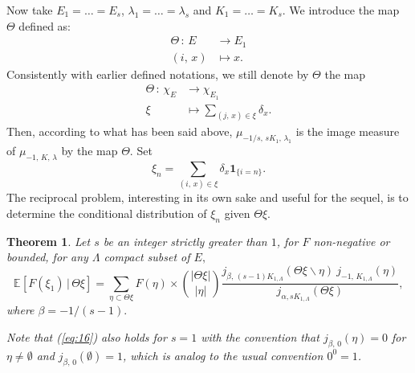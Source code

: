 \documentclass[11pt,a4paper]{amsart}
\newtheorem{Theorem}{Theorem}
\begin{document}
Now take $E_1=\ldots=E_s$, $\lambda_1=\ldots=\lambda_s$ and
$K_1=\ldots=K_s$. We introduce the map $\Theta$ defined as:
\begin{align*}
  \Theta \, :\, E&\longrightarrow E_1\\
  (i,\, x) & \longmapsto x.
\end{align*}
Consistently with earlier defined notations, we still denote by
$\Theta$ the map
\begin{align*}
  \Theta \, :\, \chi_E & \longrightarrow \chi_{E_1}\\
  \xi & \longmapsto \sum_{(j,\, x)\in \xi} \delta_{x}.
\end{align*}
Then, according to what has been said above, $\mu_{-1/s,\, sK_1,\,
  \lambda_1}$ is the image measure of $\mu_{-1, \, K,\, \lambda}$ by
the map $\Theta.$ Set
$$\xi_n=\sum_{(i,\, x)\in\xi} \delta_x{{\mathbf 1}}_{\{i=n\}}.$$ 
The reciprocal problem, interesting in its own sake and useful for the
sequel, is to determine the conditional distribution of $\xi_n$ given
$\Theta\xi.$
\begin{Theorem}
  \label{thm:conditional_distribution}
  Let $s$ be an integer strictly greater than $1$, for $F$
  non-negative or bounded, for any $\Lambda$ compact subset of $E,$
  \begin{equation}\label{eq:16}
    {{\mathbb E}_{{}}\left[{{F(\xi_1)\, |\, \Theta\xi}}\right]}=\sum_{\eta\subset \Theta\xi} F(\eta)\times 
    \binom{|\Theta\xi|}{|\eta|} \frac{j_{\beta,\,
        (s-1)K_{1,\Lambda}}(\Theta\xi\backslash \eta)\  j_{-1,\,
        K_{1,\Lambda}}(\eta)}{j_{\alpha, sK_{1,\Lambda}}(\Theta\xi)},
  \end{equation}
  where $\beta=-1/(s-1).$ 
  
  
  

  Note that (\ref{eq:16}) also holds for $s=1$ with the convention
  that $j_{\beta,\,0}(\eta)=0$ for $\eta\neq \emptyset$ and
  $j_{\beta,\,0}(\emptyset)=1$, which is analog to the usual
  convention $0^0=1$.
\end{Theorem}
\end{document}
